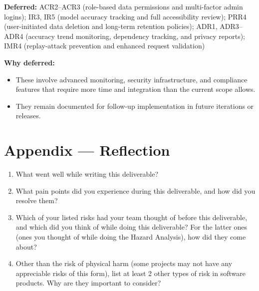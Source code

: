 \documentclass{article}
\begin{document}
\noindent \textbf{Deferred:} ACR2--ACR3 (role-based data permissions and multi-factor admin logins); IR3, IR5 (model accuracy tracking and full accessibility review); PRR4 (user-initiated data deletion and long-term retention policies); ADR1, ADR3--ADR4 (accuracy trend monitoring, dependency tracking, and privacy reports); IMR4 (replay-attack prevention and enhanced request validation)

\vspace{2mm}
\noindent \textbf{Why deferred:}
\begin{itemize}
  \item These involve advanced monitoring, security infrastructure, and compliance features that require more time and integration than the current scope allows.
  \item They remain documented for follow-up implementation in future iterations or releases.
\end{itemize}

\newpage{}

\section*{Appendix --- Reflection}



\begin{enumerate}
    \item What went well while writing this deliverable? 
    \item What pain points did you experience during this deliverable, and how
    did you resolve them?
    \item Which of your listed risks had your team thought of before this
    deliverable, and which did you think of while doing this deliverable? For
    the latter ones (ones you thought of while doing the Hazard Analysis), how
    did they come about?
    \item Other than the risk of physical harm (some projects may not have any
    appreciable risks of this form), list at least 2 other types of risk in
    software products. Why are they important to consider?
\end{enumerate}
\end{document}
